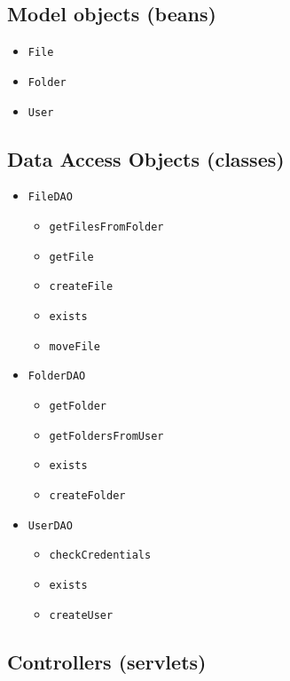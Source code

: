 \documentclass[a4paper, dvipsnames]{article}
\begin{document}
	\begin{multicols}{2}
		
		\subsection{Model objects (beans)}
		\begin{itemize}
			\item \verb|File|
			\item \verb|Folder|
			\item \verb|User|
		\end{itemize}
	
		\subsection{Data Access Objects (classes)}
		\begin{itemize}
			\item \verb|FileDAO|
			\begin{itemize}
				\item \verb|getFilesFromFolder|
				\item \verb|getFile|
				\item \verb|createFile|
				\item \verb|exists|
				\item \verb|moveFile|
			\end{itemize}
			\item \verb|FolderDAO|
			\begin{itemize}
				\item \verb|getFolder|
				\item \verb|getFoldersFromUser|
				\item \verb|exists|
				\item \verb|createFolder|
			\end{itemize}
			\item \verb|UserDAO|
			\begin{itemize}
				\item \verb|checkCredentials|
				\item \verb|exists|
				\item \verb|createUser|
			\end{itemize}
		\end{itemize}
		
		\subsection{Controllers (servlets)}
		

\end{multicols}
\end{document}
